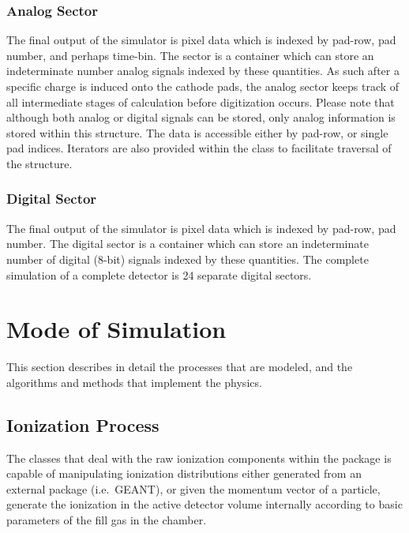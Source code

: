 \documentclass{article}
\begin{document}
\subsubsection{Analog Sector}
\label{sec:sector}

The final output of the simulator is pixel data which is indexed
by pad-row, pad number, and perhaps time-bin.  The sector is
a container which can store an indeterminate number analog signals
indexed by these quantities.  As such after a specific charge is induced
onto the cathode pads, the analog sector keeps track of all intermediate
stages of calculation before digitization occurs.  
Please note that although both analog or
digital signals can be stored, only analog information is stored within
this structure.  The data is accessible either
by pad-row, or single pad indices.  Iterators are also provided within
the class to facilitate traversal of the structure.  

\subsubsection{Digital Sector}
\label{sec:digitalSector}

The final output of the simulator is pixel data which is indexed
by pad-row, pad number.  The digital sector is
a container which can store an indeterminate number of digital (8-bit) signals
indexed by these quantities.  The complete simulation of a complete
detector is 24 separate digital sectors.


\section{Mode of Simulation} 
\label{sec:simulationProcedure}

This section describes in detail the processes that are
modeled, and the algorithms and methods that implement
the physics.
\subsection{Ionization Process}

The classes that deal with the raw ionization components within
the package is capable of manipulating ionization distributions
either generated from an external package 
(i.e.~GEANT), or given the momentum vector of a particle, generate 
the ionization in the active detector volume internally according 
to basic parameters of the fill gas in the chamber.
\end{document}
